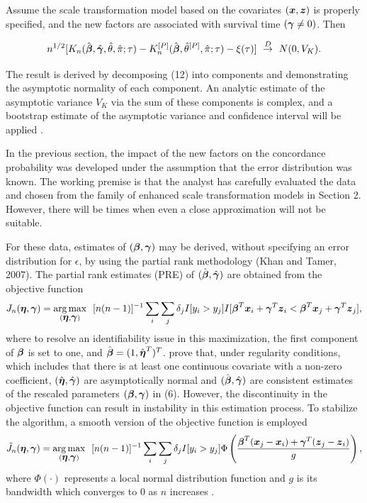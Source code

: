 \documentclass[12pt]{article}
\newcommand{\bmx}{\mbox{\boldmath $x$}}
\newcommand{\bg}{\mbox{\boldmath $\gamma$}}
\newcommand{\bb}{\mbox{\boldmath $\beta$}}
\newcommand{\bn}{\mbox{\boldmath $\eta$}}
\newcommand{\bmz}{\mbox{\boldmath $z$}}
\DeclareMathOperator*{\argmax}{arg\,max}
\begin{document}
\newline Assume the scale transformation model based on the covariates $(\bmx, \bmz)$ is properly specified, and the new factors are associated with survival time
$(\bg \ne 0)$. Then 

\begin{equation} n^{1/2} [ K_n(\hat{\bb},\hat{\bg}, \hat{\theta},\hat{\pi}; \tau) - K_n^{[P]}(\hat{\bb}, \hat{\theta}^{[P]},\hat{\pi} ; \tau)  - \xi(\tau)]  \ \stackrel{D}{\rightarrow} \ N(0, V_K) . \end{equation}

\vskip 0.35in

The result is derived by decomposing (12) into components and demonstrating the asymptotic normality of each component. An analytic estimate of the asymptotic variance $V_K$ via the sum of these components is complex, and a bootstrap estimate of the asymptotic variance and confidence interval will be applied \citep{Kosorok2004}.


 \vskip 0.35in


In the previous section, the impact of the new factors on the concordance probability was developed under the assumption that the error distribution was known.  The working premise is that the analyst has carefully evaluated the data and chosen from the family of enhanced scale transformation models in Section 2.
However, there will be times when even a close approximation will not be suitable. 

For these data, estimates of $(\bb, \bg)$ may be derived, without specifying an error distribution for $\epsilon$, by using the partial rank methodology (Khan and Tamer, 2007). The partial rank estimates (PRE) of  $(\hat{\bb},\hat{\bg})$ are obtained from the objective function
\[ J_n(\bn, \bg) = \argmax_{(\bn,\bg)} \ \ [n(n-1)]^{-1} \sum_i \sum_j \delta_j I[y_i > y_j] I[\bb^T \bmx_i + \bg^T \bmz_i < \bb^T \bmx_j + \bg^T \bmz_j] ,\]
where to resolve an identifiability issue in this maximization, 
the first component of $\bb$ is set to one, and $\hat{\bb} = (1, \hat{\bn}^T)^T$.  \cite{Khan2007} prove that, under regularity conditions, which includes that there is at least one continuous covariate with a non-zero coefficient,  $(\hat{\bn}, \hat{\bg})$ are asymptotically normal and $(\hat{\bb}, \hat{\bg})$ are consistent estimates of the rescaled parameters $(\bb, \bg)$ in (6). However, the discontinuity in the objective function can result in instability in this estimation process. To stabilize the algorithm, a smooth version of the objective function is employed
\[ \tilde{J}_n(\bn, \bg) = \argmax_{(\bn,\bg)} \ \ [n(n-1)]^{-1} \sum_i \sum_j \delta_j I[y_i > y_j] \Phi \left( \frac{\bb^T(\bmx_j - \bmx_i) + \bg^T(\bmz_j - \bmz_i)}{g} \right) , \]
where $\Phi(\cdot)$ represents a local normal distribution function and $g$ is its bandwidth which converges to 0 as $n$ increases \citep{song2007semiparametric}.
\end{document}

